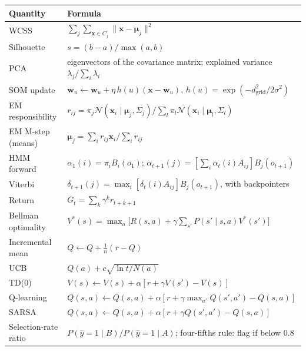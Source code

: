 \begin{longtable}{@{}L{4.0cm}L{11.0cm}@{}}
\toprule
{}
\textbf{Quantity} & \textbf{Formula} \\
\midrule
\endhead
WCSS & $\sum_j\sum_{\mathbf{x} \in C_j}\|\mathbf{x} - \boldsymbol{\mu}_j\|^2$ \\
Silhouette & $s = (b - a)/\max(a, b)$ \\
PCA & eigenvectors of the covariance matrix; explained variance $\lambda_j/\sum_i\lambda_i$ \\
SOM update & $\mathbf{w}_u \leftarrow \mathbf{w}_u + \eta\,h(u)(\mathbf{x} - \mathbf{w}_u)$, \quad $h(u) = \exp(-d_{\text{grid}}^2/2\sigma^2)$ \\
EM responsibility & $r_{ij} = \pi_j\mathcal{N}(\mathbf{x}_i \mid \boldsymbol{\mu}_j, \Sigma_j)\big/\sum_l\pi_l\mathcal{N}(\mathbf{x}_i \mid \boldsymbol{\mu}_l, \Sigma_l)$ \\
EM M-step (means) & $\boldsymbol{\mu}_j = \sum_i r_{ij}\mathbf{x}_i/\sum_i r_{ij}$ \\
HMM forward & $\alpha_1(i) = \pi_i B_i(o_1)$; \quad $\alpha_{t+1}(j) = [\sum_i\alpha_t(i)A_{ij}]B_j(o_{t+1})$ \\
Viterbi & $\delta_{t+1}(j) = \max_i[\delta_t(i)A_{ij}]B_j(o_{t+1})$, with backpointers \\
Return & $G_t = \sum_k \gamma^k r_{t+k+1}$ \\
Bellman optimality & $V^{*}(s) = \max_a\big[R(s, a) + \gamma\sum_{s'}P(s' \mid s, a)V^{*}(s')\big]$ \\
Incremental mean & $Q \leftarrow Q + \tfrac{1}{n}(r - Q)$ \\
UCB & $Q(a) + c\sqrt{\ln t / N(a)}$ \\
TD(0) & $V(s) \leftarrow V(s) + \alpha[r + \gamma V(s') - V(s)]$ \\
Q-learning & $Q(s, a) \leftarrow Q(s, a) + \alpha[r + \gamma\max_{a'}Q(s', a') - Q(s, a)]$ \\
SARSA & $Q(s, a) \leftarrow Q(s, a) + \alpha[r + \gamma Q(s', a') - Q(s, a)]$ \\
Selection-rate ratio & $P(\hat{y} = 1 \mid B)/P(\hat{y} = 1 \mid A)$; four-fifths rule: flag if below 0.8 \\
\bottomrule
\end{longtable}
